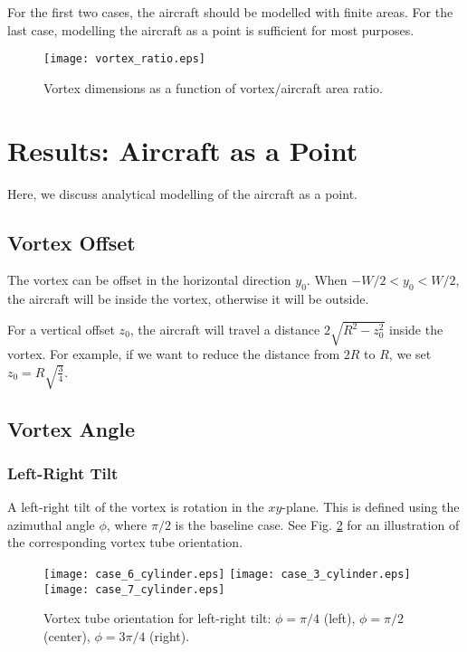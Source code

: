 \documentclass[smallextended]{svjour3}       %
\begin{document}
For the first two cases, the aircraft should be modelled with finite areas. For the last case, modelling the aircraft as a point is sufficient for most purposes.

\begin{figure}
\vspace{0.5cm}
\texttt{[image: vortex\_ratio.eps]}
\caption{Vortex dimensions as a function of vortex/aircraft area ratio.}
\label{fig:vortex_ratio}
\end{figure}

\section{Results: Aircraft as a Point}
\label{sec:ac_as_pt}

Here, we discuss analytical modelling of the aircraft as a point.

\subsection{Vortex Offset}
\label{subsec:vt_offset}

The vortex can be offset in the horizontal direction $y_0$. When $-W/2 < y_0 < W/2$, the aircraft will be inside the vortex, otherwise it will be outside.

For a vertical offset $z_0$, the aircraft will travel a distance $2 \sqrt{R^2 - z_0^2}$ inside the vortex. For example, if we want to reduce the distance from $2R$ to $R$, we set $z_0 = R \sqrt{\frac{3}{4}}$.

\subsection{Vortex Angle}

\subsubsection{Left-Right Tilt}

A left-right tilt of the vortex is rotation in the $xy$-plane. This is defined using the azimuthal angle $\phi$, where $\pi/2$ is the baseline case. See Fig. \ref{fig:phi_cylinder} for an illustration of the corresponding vortex tube orientation.

\begin{figure}
\texttt{[image: case\_6\_cylinder.eps]}
\hspace{0.5cm}
\texttt{[image: case\_3\_cylinder.eps]}
\hspace{0.5cm}
\texttt{[image: case\_7\_cylinder.eps]}
\caption{Vortex tube orientation for left-right tilt: $\phi=\pi/4$ (left), $\phi=\pi/2$ (center), $\phi=3\pi/4$ (right).}
\label{fig:phi_cylinder}
\end{figure}
\end{document}
